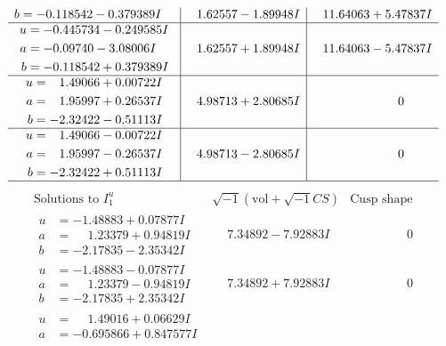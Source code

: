 \documentclass[1p]{elsarticle_modified}
\theoremstyle{definition}
\newcommand{\I}{\sqrt{-1}}
\begin{document}
$$\begin{array}{c|c|c}
\begin{aligned}
b &= -0.118542 - 0.379389 I\end{aligned}
 & \phantom{-}1.62557 - 1.89948 I & \phantom{-}11.64063 + 5.47837 I \\ \hline\begin{aligned}
u &= -0.445734 - 0.249585 I \\
a &= -0.09740 - 3.08006 I \\
b &= -0.118542 + 0.379389 I\end{aligned}
 & \phantom{-}1.62557 + 1.89948 I & \phantom{-}11.64063 - 5.47837 I \\ \hline\begin{aligned}
u &= \phantom{-}1.49066 + 0.00722 I \\
a &= \phantom{-}1.95997 + 0.26537 I \\
b &= -2.32422 - 0.51113 I\end{aligned}
 & \phantom{-}4.98713 + 2.80685 I & \phantom{-0.000000 } 0 \\ \hline\begin{aligned}
u &= \phantom{-}1.49066 - 0.00722 I \\
a &= \phantom{-}1.95997 - 0.26537 I \\
b &= -2.32422 + 0.51113 I\end{aligned}
 & \phantom{-}4.98713 - 2.80685 I & \phantom{-0.000000 } 0\\
 \hline 
 \end{array}$$\newpage$$\begin{array}{c|c|c}  
\text{Solutions to }I^u_{1}& \I (\text{vol} + \sqrt{-1}CS) & \text{Cusp shape}\\
 \hline 
\begin{aligned}
u &= -1.48883 + 0.07877 I \\
a &= \phantom{-}1.23379 + 0.94819 I \\
b &= -2.17835 - 2.35342 I\end{aligned}
 & \phantom{-}7.34892 - 7.92883 I & \phantom{-0.000000 } 0 \\ \hline\begin{aligned}
u &= -1.48883 - 0.07877 I \\
a &= \phantom{-}1.23379 - 0.94819 I \\
b &= -2.17835 + 2.35342 I\end{aligned}
 & \phantom{-}7.34892 + 7.92883 I & \phantom{-0.000000 } 0 \\ \hline\begin{aligned}
u &= \phantom{-}1.49016 + 0.06629 I \\
a &= -0.695866 + 0.847577 I \\

\end{aligned}
\end{array}$$
\end{document}
